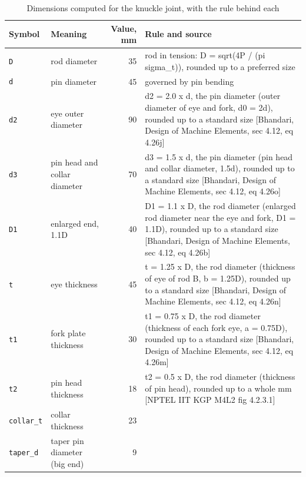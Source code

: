 \begin{table}[htbp]
\centering\scriptsize
\caption{Dimensions computed for the knuckle joint, with the rule behind each}\label{tab:dims}
\begin{tabularx}{\textwidth}{>{\raggedright\arraybackslash}p{1.3cm}>{\raggedright\arraybackslash}p{3.6cm}r>{\raggedright\arraybackslash}X}
\toprule
Symbol & Meaning & Value, mm & Rule and source \\
\midrule
\texttt{D} & rod diameter & 35 & rod in tension: D = sqrt(4P / (pi sigma\_t)), rounded up to a preferred size \\
\texttt{d} & pin diameter & 45 & governed by pin bending \\
\texttt{d2} & eye outer diameter & 90 & d2 = 2.0 x d, the pin diameter (outer diameter of eye and fork, d0 = 2d), rounded up to a standard size [Bhandari, Design of Machine Elements, sec 4.12, eq 4.26j] \\
\texttt{d3} & pin head and collar diameter & 70 & d3 = 1.5 x d, the pin diameter (pin head and collar diameter, 1.5d), rounded up to a standard size [Bhandari, Design of Machine Elements, sec 4.12, eq 4.26o] \\
\texttt{D1} & enlarged end, 1.1D & 40 & D1 = 1.1 x D, the rod diameter (enlarged rod diameter near the eye and fork, D1 = 1.1D), rounded up to a standard size [Bhandari, Design of Machine Elements, sec 4.12, eq 4.26b] \\
\texttt{t} & eye thickness & 45 & t = 1.25 x D, the rod diameter (thickness of eye of rod B, b = 1.25D), rounded up to a standard size [Bhandari, Design of Machine Elements, sec 4.12, eq 4.26n] \\
\texttt{t1} & fork plate thickness & 30 & t1 = 0.75 x D, the rod diameter (thickness of each fork eye, a = 0.75D), rounded up to a standard size [Bhandari, Design of Machine Elements, sec 4.12, eq 4.26m] \\
\texttt{t2} & pin head thickness & 18 & t2 = 0.5 x D, the rod diameter (thickness of pin head), rounded up to a whole mm [NPTEL IIT KGP M4L2 fig 4.2.3.1] \\
\texttt{collar\_t} & collar thickness & 23 &  \\
\texttt{taper\_d} & taper pin diameter (big end) & 9 &  \\
\bottomrule
\end{tabularx}
\end{table}
